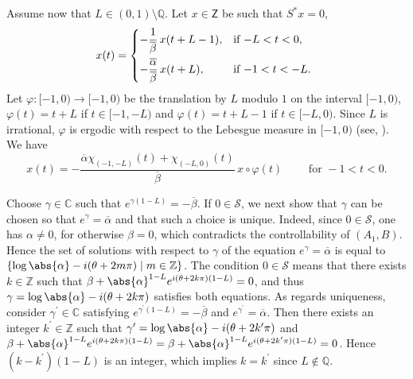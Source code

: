 Assume now that $L \in (0, 1) \setminus \mathbb Q$. Let $x \in \mathsf Z$ be such that $S^\ast x = 0$, \ie 
\[
x(t) =
\begin{dcases*}
-\frac{1}{\overline\beta}\, x(t + L - 1), & if $-L < t < 0$, \\
-\frac{\overline\alpha}{\overline\beta}\, x(t + L), & if $-1 < t < -L$.
\end{dcases*}
\]
Let $\varphi: [-1, 0) \to [-1, 0)$ be the translation by $L$ modulo $1$ on the interval $[-1, 0)$, \ie $\varphi(t) = t + L$ if $t \in [-1, -L)$ and $\varphi(t) = t + L - 1$ if $t \in [-L, 0)$. Since $L$ is irrational, $\varphi$ is ergodic with respect to the Lebesgue measure in $[-1, 0)$ (see, \eg \cite[Chap.\,II, Th.\,3.2]{Mane1987Ergodic}). We have
\[
x(t) = -\frac{\overline\alpha \chi_{(-1, -L)}(t) + \chi_{(-L, 0)}(t)}{\overline\beta}\, x \circ \varphi(t) \qquad \text{ for } -1 < t < 0.
\]

Choose $\gamma \in \mathbb C$ such that $e^{\gamma (1 - L)} = -\overline\beta$. If $0 \in \mathcal S$, we next show that $\gamma$ can be chosen so that $e^{\gamma} = \overline\alpha$ and that such a choice is unique. Indeed, since $0 \in \mathcal S$, one has $\alpha \neq 0$, for otherwise $\beta = 0$, which contradicts the controllability of $(A_1, B)$. Hence the set of solutions with respect to $\gamma$ of the equation $e^{\gamma} = \overline\alpha$ is equal to $\{\log \abs{\alpha} - i (\theta + 2 m \pi) \mid m \in \mathbb Z\}$. The condition $0 \in \mathcal S$ means that there exists $k \in \mathbb Z$ such that $\beta + \abs{\alpha}^{1 - L} e^{i (\theta + 2 k \pi)(1 - L)} = 0$, and thus $\gamma = \log \abs{\alpha} - i (\theta + 2 k \pi)$ satisfies both equations. As regards uniqueness, consider $\gamma^\prime \in \mathbb C$ satisfying $e^{\gamma^\prime (1 - L)} = -\overline\beta$ and $e^{\gamma^\prime} = \overline\alpha$. Then there exists an integer $k^\prime \in \mathbb Z$ such that $\gamma^\prime = \log \abs{\alpha} - i (\theta + 2 k^\prime \pi)$ and $\beta + \abs{\alpha}^{1 - L} e^{i (\theta + 2 k \pi)(1 - L)} = \beta + \abs{\alpha}^{1 - L} e^{i (\theta + 2 k^\prime \pi)(1 - L)} = 0$. Hence $(k - k^\prime)(1 - L)$ is an integer, which implies $k = k^\prime$ since $L \notin \mathbb Q$.

